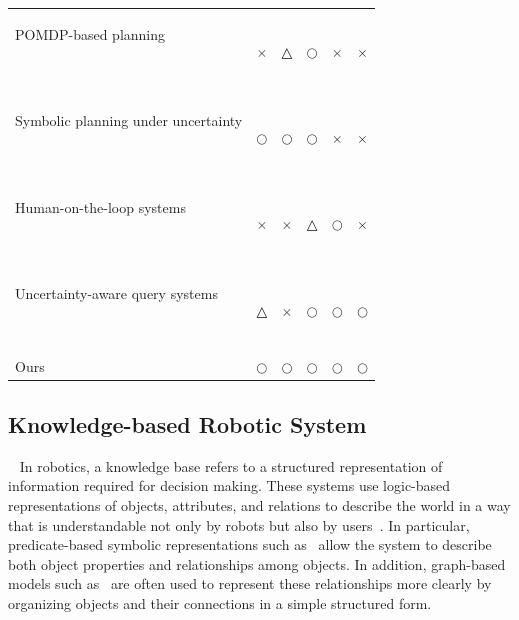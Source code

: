 \begin{table}[t]
\begin{tabular}{p{5cm}ccccc}
POMDP-based planning

~\cite{somani2013despot,bai2015intention,cramer2021probabilistic,bravo2019use,lauri2016exploration,kim2021plgrim,vanegas2016uav,xiao2019objectsearch,pajarinen2022composition}
& $\times$
& △
& $\bigcirc$
& $\times$
& $\times$ \\


Symbolic planning under uncertainty

~\cite{li2026uncertainty,sanner2010symbolic,zhang2015corpp,serrano2021knowledge,
tang2025tru}
& $\bigcirc$
& $\bigcirc$
& $\bigcirc$
& $\times$
& $\times$ \\

Human-on-the-loop systems

~\cite{scharre2015introduction,
nahavandi2017trusted,
kelly2019hg,mandlekar2020human}
& $\times$
& $\times$
& △
& $\bigcirc$
& $\times$ \\

Uncertainty-aware query systems

~\cite{knowno2023,liang2024introspective,
mullen2025lbap}
& △
& $\times$
& $\bigcirc$
& $\bigcirc$
& $\bigcirc$ \\

Ours
& $\bigcirc$
& $\bigcirc$
& $\bigcirc$
& $\bigcirc$
& $\bigcirc$ \\

\bottomrule
\end{tabular}
\end{table}



\subsection{Knowledge-based Robotic System}~\label{rel:kb}
In robotics, a knowledge base refers to a structured representation of information required for decision making. These systems use logic-based representations of objects, attributes, and relations to describe the world in a way that is understandable not only by robots but also by users~\cite{brachman2004knowledge, russell1995modern}. In particular, predicate-based symbolic representations such as~\cite{fikes1971strips, aeronautiques1998pddl} allow the system to describe both object properties and relationships among objects. In addition, graph-based models such as~\cite{johnson2015image, armeni20193d} are often used to represent these relationships more clearly by organizing objects and their connections in a simple structured form.


